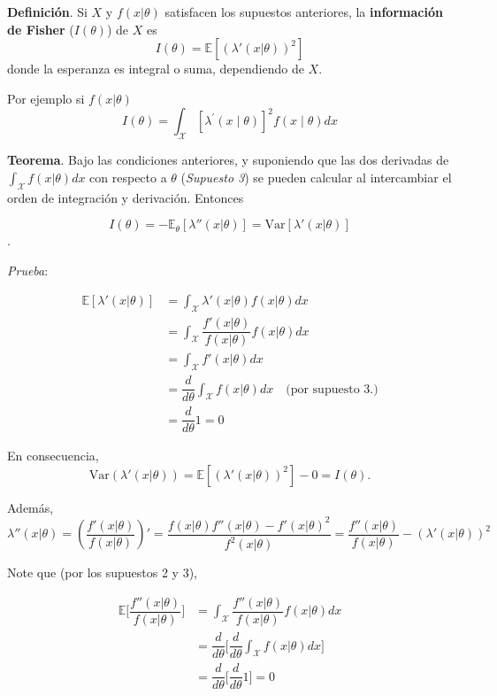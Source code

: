 \documentclass[
  12pt,
]{book}
\begin{document}
\textbf{Definición}. Si \(X\) y \(f(x|\theta)\) satisfacen los supuestos anteriores, la \textbf{información de Fisher} (\(I(\theta)\)) de \(X\) es
\[I(\theta) =\mathbb E[(\lambda'(x|\theta))^2]\]
donde la esperanza es integral o suma, dependiendo de \(X\).

Por ejemplo si \(f(x\vert\theta)\)
\begin{equation}
I(\theta)=\int_{\mathcal{X}}\left[\lambda^{\prime}(x \mid \theta)\right]^{2} f(x \mid \theta) d x
\end{equation}

\textbf{Teorema}. Bajo las condiciones anteriores, y suponiendo que las dos derivadas
de \(\int_{\mathcal X}f(x|\theta)dx\) con respecto a \(\theta\) (\emph{Supuesto 3}) se
pueden calcular al intercambiar el orden de integración y derivación. Entonces

\[I(\theta) = -\mathbb E_{\theta}[\lambda''(x|\theta)] = \text{Var}[\lambda'(x|\theta)]\].

\emph{Prueba}:

\begin{align*}
    \mathbb E[\lambda'(x|\theta)]
  & = \int_{\mathcal X}\lambda'(x|\theta)f(x|\theta)dx                                            \\
  & = \int_{\mathcal X} \dfrac{f'(x|\theta)}{f(x|\theta)}f(x|\theta)dx                            \\
  & =  \int_{\mathcal X}f'(x|\theta)dx                                                            \\
  & = \dfrac d{d\theta}\int_{\mathcal X}f(x|\theta)dx \quad \text{(por supuesto 3.)} \\
  & = \dfrac d{d\theta}1 = 0
\end{align*}

En consecuencia,
\[\text{Var}(\lambda'(x|\theta)) = \mathbb E[(\lambda'(x|\theta))^2]-0 = I(\theta).\]

Además,
\[\lambda''(x|\theta)= \left(\dfrac{f'(x|\theta)}{f(x|\theta)}\right)' = \dfrac{f(x|\theta)f''(x|\theta)-f'(x|\theta)^2}{f^2(x|\theta)} =\dfrac{f''(x|\theta)}{f(x|\theta)} - (\lambda'(x|\theta))^2 \]

Note que (por los supuestos 2 y 3),

\begin{align*}
\mathbb E\bigg[\dfrac{f''(x|\theta)}{f(x|\theta)} \bigg] & = \int_{\mathcal X}\dfrac{f''(x|\theta)}{f(x|\theta)} f(x|\theta)dx \\
&=\dfrac{d}{d\theta}\bigg[\dfrac{d}{d\theta}\int_{\mathcal X}f(x|\theta)dx\bigg]\\
& = \dfrac{d}{d\theta}\bigg[\dfrac{d}{d\theta}1\bigg] = 0
\end{align*}
\end{document}

